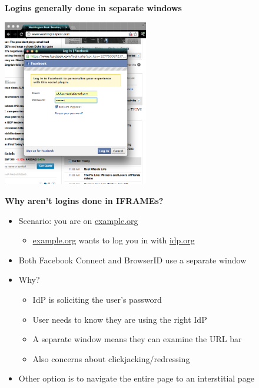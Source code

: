 \documentclass[helvetica]{seminar}
\newcommand{\heading}[1]{%
  \begin{center} 
    \large\bf 
    #1 
  \end{center} 
  \vspace{.4 in}}
\begin{document}
\begin{slide}

\heading{Logins generally done in separate windows}

\vspace{-.4in}
\begin{center}
\includegraphics[width=2.5in]{fb-login}
\end{center}

\end{slide}



\begin{slide}
\heading{Why aren't logins done in IFRAMEs?}

\begin{itemize}
\item Scenario: you are on \url{example.org}
  \begin{itemize}
  \item \url{example.org} wants to log you in with \url{idp.org}
  \end{itemize}

\item Both Facebook Connect and BrowserID use a separate window
\item Why?
  \begin{itemize}
  \item IdP is soliciting the user's password
  \item User needs to know they are using the right IdP
  \item A separate window means they can examine the URL bar
  \item Also concerns about clickjacking/redressing
  \end{itemize}

\item Other option is to navigate the entire page to an interstitial page
\end{itemize}
\end{slide}
\end{document}
